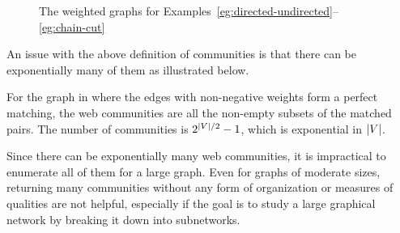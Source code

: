 \begin{figure}
{
	}
	\caption{The weighted graphs for Examples~\ref{eg:directed-undirected}--\ref{eg:chain-cut}}
        \label{fig:eg12}
\end{figure}

An issue with the above definition of communities is that there can be exponentially many of them as illustrated below.

\begin{example}
  \label{eg:too-many-communities}
  For the graph in  where the edges with non-negative weights form a perfect matching, the web communities are all the non-empty subsets of the matched pairs. The number of communities is $2^{\lvert V\rvert/2}-1$, which is exponential in $\lvert V\rvert$.
\end{example}

Since there can be exponentially many web communities, it is impractical to enumerate all of them for a large graph. Even for graphs of moderate sizes, returning many communities without any form of organization or measures of qualities are not helpful, especially if the goal is to study a large graphical network by breaking it down into subnetworks. 

